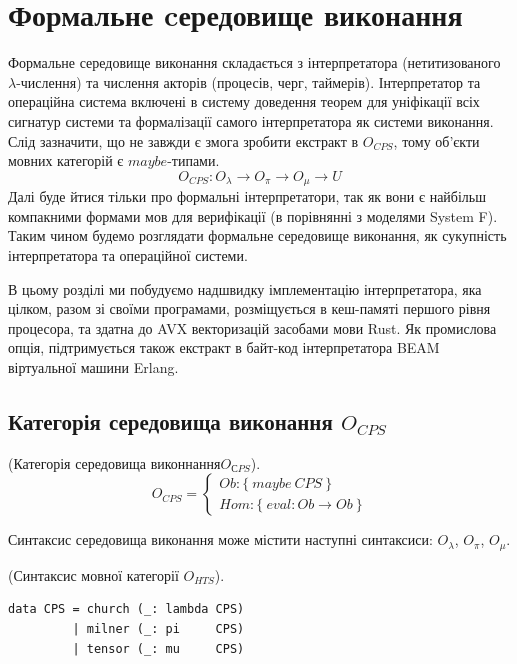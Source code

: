 \section{Формальне cередовище виконання}
Формальне середовище виконання складається з інтерпретатора
(нетитизованого $\lambda$-числення) та числення акторів (процесів, черг, таймерів).
Інтерпретатор та операційна система включені в систему доведення теорем
для уніфікації всіх сигнатур системи та формалізації самого інтерпретатора
як системи виконання. Слід зазначити, що не
завжди є змога зробити екстракт в $O_{CPS}$, тому об'єкти мовних
категорій є $maybe$-типами.
$$
O_{CPS}: O_\lambda \rightarrow O_\pi \rightarrow O_\mu \rightarrow U
$$
Далі буде йтися тільки про формальні інтерпретатори,
так як вони є найбільш компакними формами мов для
верифікації (в порівнянні з моделями System F).
Таким чином будемо розглядати формальне середовище виконання, як
сукупність інтерпретатора та операційної системи.

В цьому розділі ми побудуємо надшвидку імплементацію інтерпретатора,
яка цілком, разом зі своїми програмами, розміщується в кеш-памяті
першого рівня процесора, та здатна до AVX векторизацій засобами мови Rust.
Як промислова опція, підтримується також екстракт
в байт-код інтерпретатора BEAM віртуальної машини Erlang.


\newpage
\subsection{Категорія середовища виконання $O_{CPS}$}

\begin{definition} (Категорія середовища виконнання$O_{СPS}$).
$$
O_{CPS} =
\begin{cases}
Ob: \{\ maybe\ CPS\ \} \\
Hom: \{\ eval: Ob \rightarrow Ob\ \}
\end{cases}
$$
\end{definition}

Синтаксис середовища виконання може містити наступні синтаксиси:
$O_\lambda$, $O_\pi$, $O_\mu$.

\begin{definition} (Синтаксис мовної категорії $O_{HTS}$).
\begin{lstlisting}
data CPS = church (_: lambda CPS)
         | milner (_: pi     CPS)
         | tensor (_: mu     CPS)
\end{lstlisting}
\end{definition}


